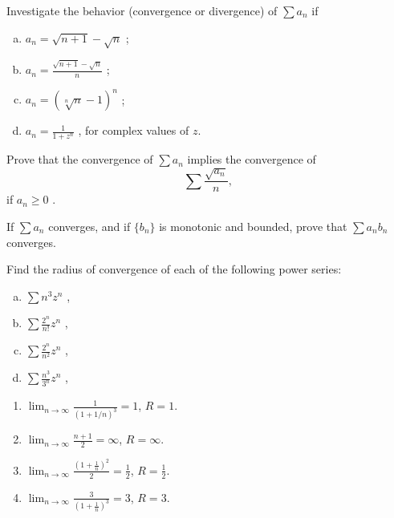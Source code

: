 \begin{myExercise}
    \label{ex:3.6}
    Investigate the behavior (convergence or divergence) of $\sum a_n$ if
    \begin{enumerate}[(a)]
        \item $a_n = \sqrt{n+1} - \sqrt{n}$ ;
        \item $a_n = \frac{\sqrt{n+1} - \sqrt{n}}{n}$ ;
        \item $a_n = (\sqrt[n]{n} - 1)^n$ ;
        \item $a_n = \frac{1}{1+z^n}$ , for complex values of $z$.
    \end{enumerate}
\end{myExercise}

\begin{myExercise}
    \label{ex:3.7}
    Prove that the convergence of $\sum a_n$ implies the convergence of
    \begin{equation*}
        \sum \frac{\sqrt{a_n}}{n},
    \end{equation*}
    if $a_n \geq 0$ .
\end{myExercise}


\begin{myExercise}
    \label{ex:3.8}
    If $\sum a_n$ converges, 
    and if $\{b_n\}$ is monotonic and bounded, 
    prove that $\sum a_n b_n$ converges.
\end{myExercise}


\begin{myExercise}
    \label{ex:3.9}
    Find the radius of convergence of each of the following power series:
    \begin{enumerate}[(a)]
        \item $\sum n^3z^n$ ,
        \item $\sum \frac{2^n}{n!}z^n$ ,
        \item $\sum \frac{2^n}{n^2}z^n$ ,
        \item $\sum \frac{n^3}{3^n}z^n$ ,
    \end{enumerate}
\end{myExercise}

\mySolve
\begin{enumerate}
    \item $\lim_{n \to \infty} \frac{1}{(1+1/n)^3} = 1$, $R = 1$.
    \item $\lim_{n \to \infty} \frac{n + 1}{2} = \infty$, $R = \infty$.
    \item $\lim_{n \to \infty} \frac{\left( 1+\frac{1}{n} \right)^2}{2} = \frac{1}{2}$, $R = \frac{1}{2}$.
    \item $\lim_{n \to \infty} \frac{3}{\left( 1+\frac{1}{n} \right)^3} = 3$, $R = 3$.
\end{enumerate}

